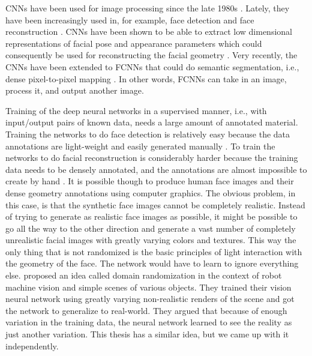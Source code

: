 \acp{CNN} have been used for image processing since the late 1980s \cite{LeCun1989}. Lately, they have been increasingly used in, for example, face detection \cite{Osadchy2007} and face reconstruction \cite{Richardson2016a}. \acp{CNN} have been shown to be able to extract low dimensional representations of facial pose and appearance parameters which could consequently be used for reconstructing the facial geometry \cite{Kim2017}. Very recently, the \acp{CNN} have been extended to \acp{FCNN} that could do semantic segmentation, i.e., dense pixel-to-pixel mapping \cite{Long2015,Isola2016}. In other words, \acp{FCNN} can take in an image, process it, and output another image.

Training of the deep neural networks in a supervised manner, i.e., with input/output pairs of known data, needs a large amount of annotated material. Training the networks to do face detection is relatively easy because the data annotations are light-weight and easily generated manually \cite{Osadchy2007}. To train the networks to do facial reconstruction is considerably harder because the training data needs to be densely annotated, and the annotations are almost impossible to create by hand \cite{Richardson2016a}. It is possible though to produce human face images and their dense geometry annotations using computer graphics. The obvious problem, in this case, is that the synthetic face images cannot be completely realistic. Instead of trying to generate as realistic face images as possible, it might be possible to go all the way to the other direction and generate a vast number of completely unrealistic facial images with greatly varying colors and textures. This way the only thing that is not randomized is the basic principles of light interaction with the geometry of the face. The network would have to learn to ignore everything else. \textcite{Tobin2017} proposed an idea called domain randomization in the context of robot machine vision and simple scenes of various objects. They trained their vision neural network using greatly varying non-realistic renders of the scene and got the network to generalize to real-world. They argued that because of enough variation in the training data, the neural network learned to see the reality as just another variation. This thesis has a similar idea, but we came up with it independently.

